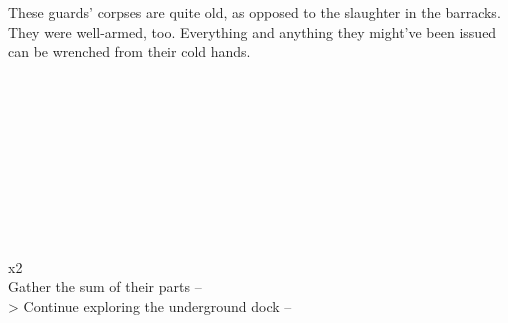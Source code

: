 These guards’ corpses are quite old, as opposed to the slaughter in the barracks. They were well-armed, too. Everything and anything they might’ve been issued can be wrenched from their cold hands.\\
\\
\\
\\
\\
\\
\\
\\
\\
\\
\\
 x2\\

 Gather the sum of their parts -- \\
> Continue exploring the underground dock -- 